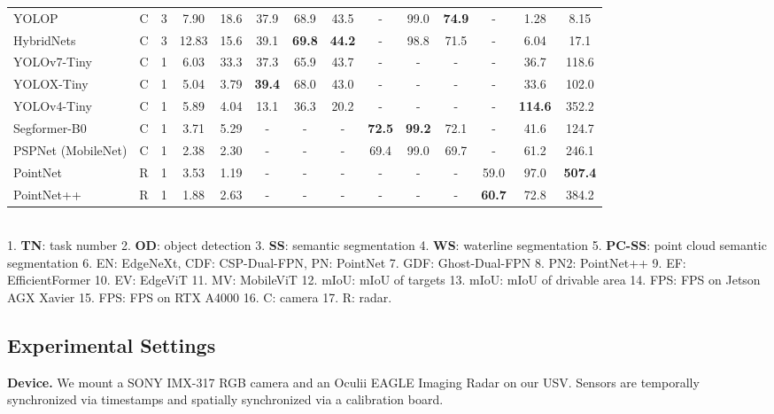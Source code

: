 \documentclass[letterpaper, 10 pt, conference]{ieeeconf}
\begin{document}
\begin{table*}
\begin{tabular}{l|cc|cc|ccc|cc|c|c|cc}
YOLOP \cite{yolop} & C & 3 & 7.90 & 18.6 & 37.9 & 68.9 & 43.5 & - & 99.0 & \textbf{74.9} & - & 1.28 & 8.15\\
HybridNets \cite{hybridnets} & C & 3 & 12.83 & 15.6 & 39.1 & \textbf{69.8} & \textbf{44.2} & - & 98.8 & 71.5 & - & 6.04 & 17.1\\
\midrule
YOLOv7-Tiny \cite{wang2022yolov7} & C &  1 & 6.03 & 33.3 & 37.3 & 65.9 & 43.7 & - & - & - & - & 36.7 & 118.6 \\
YOLOX-Tiny \cite{ge2021yolox} & C &  1 & 5.04 & 3.79 & \textbf{39.4} & 68.0 & 43.0 & - & - & - & - & 33.6 & 102.0 \\
YOLOv4-Tiny \cite{bochkovskiy2020yolov4} & C &  1 & 5.89 & 4.04 & 13.1 & 36.3 & 20.2 & - & - & - & - & \textbf{114.6} & 352.2\\
\midrule
Segformer-B0 \cite{xie2021segformer} & C &  1 & 3.71 & 5.29 & - & - & - & \textbf{72.5} & \textbf{99.2} & 72.1 & - & 41.6 & 124.7\\
PSPNet (MobileNet) \cite{zhao2017pyramid} & C &  1 & 2.38 & 2.30 & - & - & - & 69.4 & 99.0 & 69.7 & - & 61.2 & 246.1 \\
\midrule
PointNet \cite{Charles_Su_Kaichun_Guibas_2017} & R &  1 & 3.53 & 1.19 & - &- &- &- &- &- & 59.0 & 97.0 & \textbf{507.4} \\
PointNet++ \cite{Qi_Yi_Su_Guibas_2017} & R &  1 & 1.88 & 2.63 & - &- &- &- &- &- & \textbf{60.7} & 72.8 & 384.2 \\
\bottomrule
\end{tabular}
\\
\vspace{1mm}
\scriptsize{1. \textbf{TN}: task number 2. \textbf{OD}: object detection 3. \textbf{SS}: semantic segmentation 4. \textbf{WS}: waterline segmentation 5. \textbf{PC-SS}: point cloud semantic segmentation 6. EN: EdgeNeXt, CDF: CSP-Dual-FPN, PN: PointNet 7. GDF: Ghost-Dual-FPN 8. PN2: PointNet++ 9. EF: EfficientFormer 10. EV: EdgeViT 11. MV: MobileViT 12. mIoU: mIoU of targets 13. mIoU: mIoU of drivable area 14. FPS: FPS on Jetson AGX Xavier 15. FPS: FPS on RTX A4000 16. C: camera 17. R: radar.}
\end{table*}

\subsection{Experimental Settings}
 \textbf{Device.} We mount a SONY IMX-317 RGB camera and an Oculii EAGLE Imaging Radar on our USV. Sensors are temporally synchronized via timestamps and spatially synchronized via a calibration board. 
\end{document}
